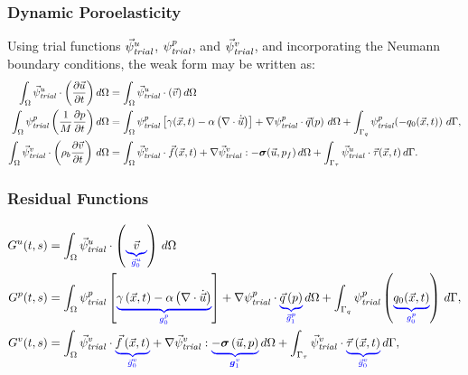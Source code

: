 \documentclass[aspectratio=169,hyperref=colorlinks]{beamer}
\begin{document}
\begin{frame}
  \frametitle{Dynamic Poroelasticity}
Using trial functions $\trialvec[u]$, $\trialscalar[p]$, and $\trialvec[v]$, and incorporating the
Neumann boundary conditions, the weak form may be written as:
{\small
\begin{align*}
    \int_{\Omega} \trialvec[u] \cdot \left( \frac{\partial \vec{u}}{\partial t} \right)d \Omega &= \int_{\Omega} \trialvec[u] \cdot \left( \vec{v} \right) d \Omega \\
    \int_{\Omega} \trialscalar[p] \left( \frac{1}{M}\frac{\partial p}{\partial t} \right) d\Omega &=
    \int_{\Omega} \trialscalar[p] \left[\gamma(\vec{x},t) - \alpha \left(\nabla \cdot \dot{\vec{u}}\right) \right]  + \nabla \trialscalar[p] \cdot \vec{q}(p) \ d\Omega +
    \int_{\Gamma_q} \trialscalar[p] (-q_0(\vec{x},t)) \ d\Gamma, \\
   \int_\Omega \trialvec[v] \cdot \left( \rho_{b} \frac{\partial
   \vec{v}}{\partial t} \right) \,
   d\Omega &= \int_\Omega \trialvec[v] \cdot \vec{f}(\vec{x},t) + \nabla \trialvec[v] :
   -\tensor{\sigma} (\vec{u},p_f) \, d\Omega + \int_{\Gamma_\tau} \trialvec[u]
   \cdot \vec{\tau}(\vec{x},t) \, d\Gamma.
\end{align*}}
  
\end{frame}


\begin{frame}
  \frametitle{Residual Functions}
  {\small
  \begin{align*}
 G^u(t,s) &= \int_\Omega \trialvec[u] \cdot \left(\eqnannotate{\vec{v}}{\vec{g}^u_0}\right) \, d\Omega \\
  G^p(t,s) &= \int_\Omega  \trialscalar[p] \left[\eqnannotate{\gamma \left(\vec{x},t \right) - \alpha \left(\nabla \cdot \dot{\vec{u}} \right)}{g^p_0} \right]
                     + \nabla \trialscalar[p] \cdot \eqnannotate{\vec{q}\left(p\right)}{\vec{g}^p_1} \, d\Omega
                     + \int_{\Gamma_q} \trialscalar[p] \left(\eqnannotate{q_0(\vec{x},t)}{g^p_0}\right) \, d\Gamma, \\
  G^v(t,s) &= \int_\Omega \trialvec[v] \cdot \eqnannotate{\vec{f}\left(\vec{x},t\right)}{\vec{g}^v_0}
                     + \nabla \trialvec[v] : \eqnannotate{-\tensor{\sigma}\left(\vec{u},p\right)}{\tensor{g}^v_1} \, d\Omega
                     + \int_{\Gamma_\tau} \trialvec[v] \cdot \eqnannotate{\vec{\tau}\left(\vec{x},t\right)}{\vec{g}^v_0} \, d\Gamma,
\end{align*}}
\end{frame}
\end{document}
